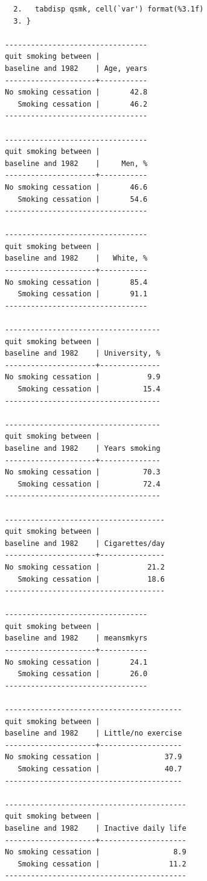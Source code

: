 \documentclass[
  10pt,
]{book}
\begin{document}
\begin{verbatim}
  2.   tabdisp qsmk, cell(`var') format(%3.1f)
  3. }

---------------------------------
quit smoking between |
baseline and 1982    | Age, years
---------------------+-----------
No smoking cessation |       42.8
   Smoking cessation |       46.2
---------------------------------

---------------------------------
quit smoking between |
baseline and 1982    |     Men, %
---------------------+-----------
No smoking cessation |       46.6
   Smoking cessation |       54.6
---------------------------------

---------------------------------
quit smoking between |
baseline and 1982    |   White, %
---------------------+-----------
No smoking cessation |       85.4
   Smoking cessation |       91.1
---------------------------------

------------------------------------
quit smoking between |
baseline and 1982    | University, %
---------------------+--------------
No smoking cessation |           9.9
   Smoking cessation |          15.4
------------------------------------

------------------------------------
quit smoking between |
baseline and 1982    | Years smoking
---------------------+--------------
No smoking cessation |          70.3
   Smoking cessation |          72.4
------------------------------------

-------------------------------------
quit smoking between |
baseline and 1982    | Cigarettes/day
---------------------+---------------
No smoking cessation |           21.2
   Smoking cessation |           18.6
-------------------------------------

---------------------------------
quit smoking between |
baseline and 1982    | meansmkyrs
---------------------+-----------
No smoking cessation |       24.1
   Smoking cessation |       26.0
---------------------------------

-----------------------------------------
quit smoking between |
baseline and 1982    | Little/no exercise
---------------------+-------------------
No smoking cessation |               37.9
   Smoking cessation |               40.7
-----------------------------------------

------------------------------------------
quit smoking between |
baseline and 1982    | Inactive daily life
---------------------+--------------------
No smoking cessation |                 8.9
   Smoking cessation |                11.2
------------------------------------------
\end{verbatim}
\end{document}
